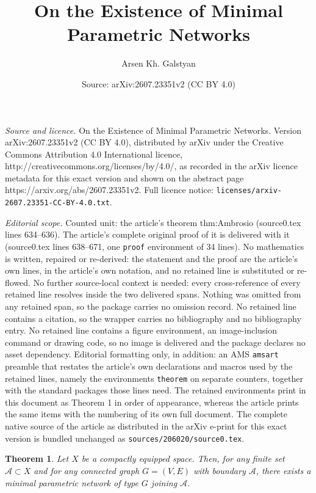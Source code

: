 \documentclass[10pt,a4paper]{amsart}
\title{On the Existence of Minimal Parametric Networks}
\author{Arsen Kh. Galstyan}
\date{Source: arXiv:2607.23351v2 (CC BY 4.0)}
\newtheorem{theorem}{Theorem}
\begin{document}
\maketitle

\noindent\emph{Source and licence.} On the Existence of Minimal Parametric Networks. Version arXiv:2607.23351v2 (CC BY 4.0), distributed by arXiv under the Creative Commons Attribution 4.0 International licence, http://creativecommons.org/licenses/by/4.0/, as recorded in the arXiv licence metadata for this exact version and shown on the abstract page https://arxiv.org/abs/2607.23351v2. Full licence notice: \texttt{licenses/arxiv-2607.23351-CC-BY-4.0.txt}.\par\smallskip

\noindent\textit{Editorial scope.} Counted unit: the article's theorem thm:Ambrosio (source0.tex lines 634--636). The article's complete original proof of it is delivered with it (source0.tex lines 638--671, one \texttt{proof} environment of 34 lines). No mathematics is written, repaired or re-derived: the statement and the proof are the article's own lines, in the article's own notation, and no retained line is substituted or re-flowed.  No further source-local context is needed: every cross-reference of every retained line resolves inside the two delivered spans.  Nothing was omitted from any retained span, so the package carries no omission record.  No retained line contains a citation, so the wrapper carries no bibliography and no bibliography entry.  No retained line contains a figure environment, an image-inclusion command or drawing code, so no image is delivered and the package declares no asset dependency.  Editorial formatting only, in addition: an AMS \texttt{amsart} preamble that restates the article's own declarations and macros used by the retained lines, namely the environments \texttt{theorem} on separate counters, together with the standard packages those lines need.  The retained environments print in this document as Theorem 1 in order of appearance, whereas the article prints the same items with the numbering of its own full document.  The complete native source of the article as distributed in the arXiv e-print for this exact version is bundled unchanged as \texttt{sources/206020/source0.tex}.
\begin{theorem}\label{thm:Ambrosio}
Let $X$ be a compactly equipped space. Then, for any finite set $\mathcal{A}\subset X$ and for any connected graph $G = (V, E)$ with boundary $\mathcal{A}$, there exists a minimal parametric network of type $G$ joining $\mathcal{A}$.
\end{theorem}
\end{document}
